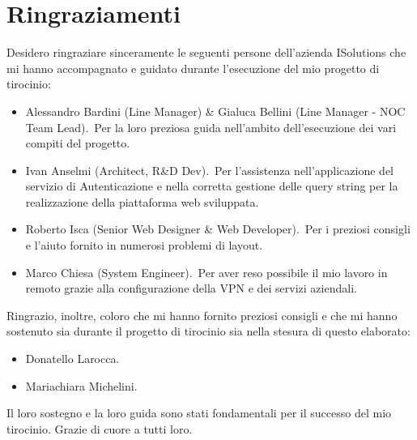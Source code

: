 \chapter*{Ringraziamenti}
Desidero ringraziare sinceramente le seguenti persone dell'azienda ISolutions che mi hanno 
accompagnato e guidato durante l'esecuzione del mio progetto di tirocinio:
\begin{itemize}
    \item Alessandro Bardini (Line Manager) \& Gialuca Bellini (Line Manager \-- NOC Team Lead).\ Per la loro preziosa guida nell'ambito dell'esecuzione dei vari compiti del progetto.
    \item Ivan Anselmi (Architect, R\&D Dev).\ Per l'assistenza nell'applicazione del servizio di Autenticazione e nella corretta gestione delle query string per la realizzazione della piattaforma web sviluppata.
    \item Roberto Isca (Senior Web Designer \& Web Developer).\ Per i preziosi consigli e l'aiuto fornito in numerosi problemi di layout.
    \item Marco Chiesa (System Engineer).\ Per aver reso possibile il mio lavoro in remoto grazie alla configurazione della VPN e dei servizi aziendali.
\end{itemize}
%
Ringrazio, inoltre, coloro che mi hanno fornito preziosi consigli e che mi hanno sostenuto sia durante il progetto di tirocinio sia nella stesura di questo elaborato:
\begin{itemize}
    \item Donatello Larocca.
    \item Mariachiara Michelini.
\end{itemize}
%
Il loro sostegno e la loro guida sono stati fondamentali per il successo del mio tirocinio. Grazie di cuore a tutti loro.